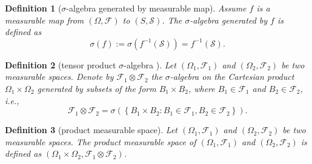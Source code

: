 \documentclass{report}
\newtheorem{definition}{Definition}[section]
\theoremstyle{nonumberplain}
\begin{document}
\begin{definition}[$\sigma$-algebra generated by measurable map]
	Assume $f$ is a measurable map from $(\Omega,\mathcal{F})$ to $(S,\mathcal{S})$. The $\sigma$-algebra generated by $f$ is defined as
	\[
	\sigma(f):=\sigma\left(f^{-1}(\mathcal{S})\right)=f^{-1}(\mathcal{S}).
	\]
\end{definition}

\begin{definition}[tensor product $\sigma$-algebra ]
	Let $(\Omega_1,\mathcal{F}_1)$ and $(\Omega_2,\mathcal{F}_2)$ be two measurable spaces. Denote by $\mathcal{F}_1\otimes\mathcal{F}_2$ the $\sigma$-algebra on the Cartesian product $\Omega_1\times\Omega_2$ generated by subsets of the form $B_1\times B_2$, where $B_{1}\in\mathcal{F}_1$ and $B_{2}\in\mathcal{F}_2$, i.e., 
	\[
	\mathcal{F}_{1} \otimes \mathcal{F}_{2} = \sigma\left(\left\{B_{1} \times B_{2}: B_{1} \in \mathcal{F}_{1}, B_{2} \in \mathcal{F}_{2}\right\}\right).
	\]
\end{definition}

\begin{definition}[product measurable space]
	Let $(\Omega_1,\mathcal{F}_1)$ and $(\Omega_2,\mathcal{F}_2)$ be two measurable spaces. The \emph{product measurable space} of $(\Omega_1,\mathcal{F}_1)$ and $(\Omega_2,\mathcal{F}_2)$ is defined as $(\Omega_1\times\Omega_2,\mathcal{F}_1\otimes\mathcal{F}_2)$. 
\end{definition}
\end{document}
